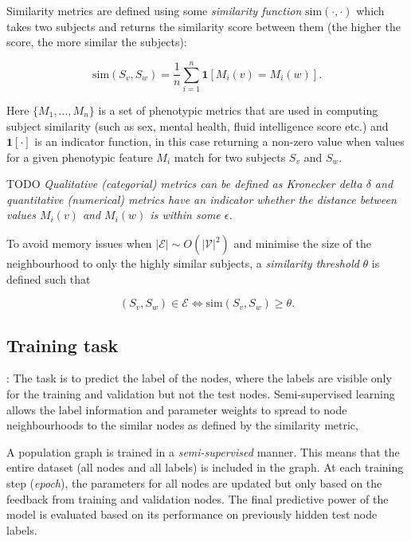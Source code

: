 Similarity metrics are defined using some \textit{similarity function} $\mathrm{sim}(\cdot, \cdot)$ which takes two subjects and returns the similarity score between them (the higher the score, the more similar the subjects):

\begin{equation}
    \mathrm{sim}(S_v, S_w) = \frac{1}{n}\sum_{i=1}^{n} \mathbf{1}[M_i(v) = M_i(w)].
\end{equation}

Here $\{M_1, \dots, M_n\}$ is a set of phenotypic metrics that are used in computing subject similarity (such as sex, mental health, fluid intelligence score etc.) and $\mathbf{1}[\cdot]$ is an indicator function, in this case returning a non-zero value when values for a given phenotypic feature $M_i$ match for two subjects $S_v$ and $S_w$.

TODO \textit{Qualitative (categorial) metrics can be defined as Kronecker delta $\delta$ and quantitative (numerical) metrics have an indicator whether the distance between values $M_i(v)$ and $M_i(w)$ is within some $\epsilon$.}

To avoid memory issues when $|\mathcal{E}| \sim O(|\mathcal{V}|^2)$ and minimise the size of the neighbourhood to only the highly similar subjects, a \textit{similarity threshold} $\theta$ is defined such that

\begin{equation}
    (S_v, S_w) \in \mathcal{E} \iff \mathrm{sim}(S_v, S_w) \geq \theta.
\end{equation}

\subsection{Training task}
\cite{kipf2017semi}: The task is to predict the label of the nodes, where the labels are visible only for the training and validation but not the test nodes. Semi-supervised learning allows the label information and parameter weights to spread to node neighbourhoods to the similar nodes as defined by the similarity metric, 

A population graph is trained in a \textit{semi-supervised} manner. This means that the entire dataset (all nodes and all labels) is included in the graph. At each training step (\textit{epoch}), the parameters for all nodes are updated but only based on the feedback from training and validation nodes. The final predictive power of the model is evaluated based on its performance on previously hidden test node labels.

